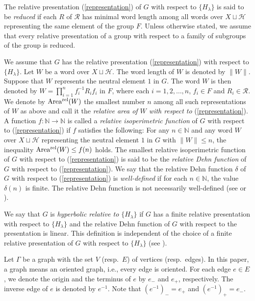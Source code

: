 \documentclass{amsart}
\theoremstyle{definition}
\begin{document}
The relative presentation (\ref{representation}) of $G$ with respect to $\{H_\lambda\}$ is said to be {\it reduced} if each $R$ of $\mathcal R$ has minimal word length among all words over $X \sqcup \mathcal{H}$ representing the same element of the group $F$. 
Unless otherwise stated, we assume that every relative presentation of a group with respect to a family of subgroups of the group is reduced. 

We assume that $G$ has the relative presentation (\ref{representation}) with respect to $\{H_\lambda\}$. 
Let $W$ be a word over $X\sqcup {\mathcal H}$. 
The word length of $W$ is denoted by $\|W\|$. 
Suppose that $W$ represents the neutral element $1$ in $G$. 
The word $W$ is then denoted by $W= \prod_{i=1}^{n} f_i^{-1} R_i f_i$ in $F$, where each $i=1,2,\ldots,n$, $f_i\in F$ and $R_i\in{\mathcal R}$. 
We denote by ${{\rm Area^{rel}}}(W)$ the smallest number $n$ among all such representations of $W$ as above and call it the {\it relative area of $W$ with respect to} (\ref{representation}). 
A function $f \colon {\mathbb{N}} \rightarrow {\mathbb{N}}$ is called a {\it relative isoperimetric function} of $G$ with respect to (\ref{representation}) if $f$ satisfies the following: 
For any $n\in \mathbb N$ and any word $W$ over $X\sqcup {\mathcal H}$ representing the neutral element $1$ in $G$ with $\|W\|\leq n$, the inequality ${{\rm Area^{rel}}}(W)\leq f(n)$ holds. 
The smallest relative isoperimetric function of $G$ with respect to (\ref{representation}) is said to be the {\it relative Dehn function} of $G$ with respect to (\ref{representation}). 
We say that the relative Dehn function $\delta$ of $G$ with respect to (\ref{representation}) is {\it well-defined} if for each $n\in{\mathbb{N}}$, the value $\delta(n)$ is finite. 
The relative Dehn function is not necessarily well-defined (see \cite[Example 2.55]{Osi06} or \cite[p.100]{Osi06a}). 

We say that $G$ is {\it hyperbolic relative to $\{H_\lambda\}$} if $G$ has a finite relative presentation with respect to $\{H_\lambda\}$ and the relative Dehn function of $G$ with respect to the presentation is linear. 
This definition is independent of the choice of a finite relative presentation of $G$ with respect to $\{H_\lambda\}$ (see \cite[Theorem 2.34]{Osi06}). 

Let $\Gamma$ be a graph with the set $V$ (resp.\ $E$) of vertices (resp.\ edges). 
In this paper, a graph means an oriented graph, i.e., every edge is oriented. 
For each edge $e\in E$, we denote the origin and the terminus of $e$ by $e_-$ and $e_+$, respectively. 
The inverse edge of $e$ is denoted by $e^{-1}$. 
Note that $(e^{-1})_-=e_+$ and $(e^{-1})_+=e_-$. 
\end{document}
